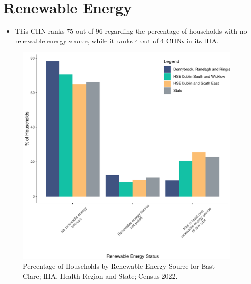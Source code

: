 \documentclass{article}
\begin{document}
\section{Renewable Energy}\label{sect:RE}
\begin{itemize}
\item This CHN ranks  75 out of 96 regarding the percentage of households with no renewable energy source, while it ranks   4 out of 4 CHNs in its IHA.
\end{itemize}
\begin{figure}[H]
	\centering
	\includegraphics[width = 140mm]{../figures/RenewableEnergyED.pdf}
	\caption{Percentage of Households by Renewable Energy Source for East Clare; IHA, Health Region and State; Census 2022.}
	\label{fig:vbnv}
	\end{figure}
\end{document}
